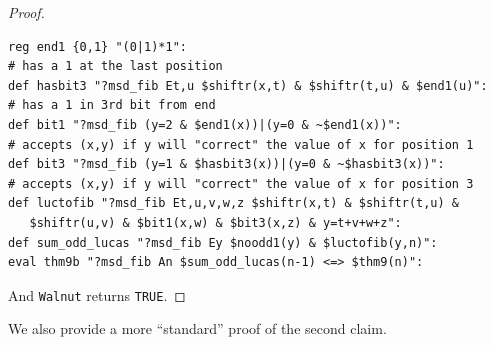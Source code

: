 \documentclass[12pt,reqno]{article}
\begin{document}
\begin{proof}
\begin{verbatim}
reg end1 {0,1} "(0|1)*1":
# has a 1 at the last position
def hasbit3 "?msd_fib Et,u $shiftr(x,t) & $shiftr(t,u) & $end1(u)":
# has a 1 in 3rd bit from end
def bit1 "?msd_fib (y=2 & $end1(x))|(y=0 & ~$end1(x))":
# accepts (x,y) if y will "correct" the value of x for position 1
def bit3 "?msd_fib (y=1 & $hasbit3(x))|(y=0 & ~$hasbit3(x))":
# accepts (x,y) if y will "correct" the value of x for position 3
def luctofib "?msd_fib Et,u,v,w,z $shiftr(x,t) & $shiftr(t,u) & 
   $shiftr(u,v) & $bit1(x,w) & $bit3(x,z) & y=t+v+w+z":
def sum_odd_lucas "?msd_fib Ey $noodd1(y) & $luctofib(y,n)":
eval thm9b "?msd_fib An $sum_odd_lucas(n-1) <=> $thm9(n)":
\end{verbatim}
And {\tt Walnut} returns {\tt TRUE}.
\end{proof}

We also provide a more ``standard'' proof of the second claim.
\end{document}
